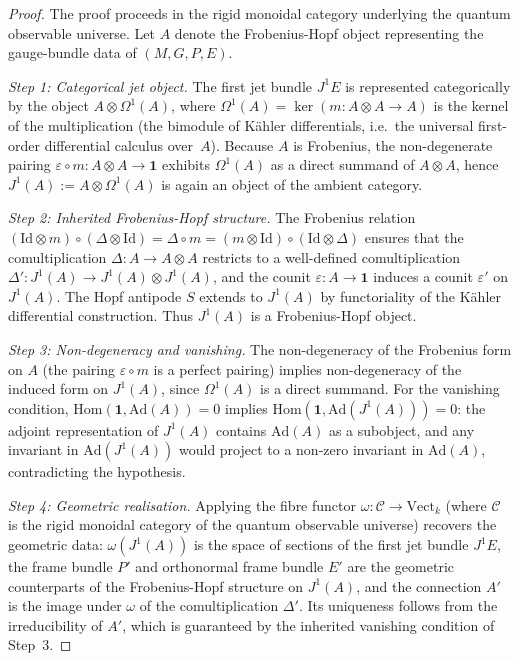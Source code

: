 \documentclass[12pt,a4paper]{report}
\begin{document}
\begin{proof}
The proof proceeds in the rigid monoidal category underlying the quantum
observable universe.  Let $A$ denote the Frobenius-Hopf object
representing the gauge-bundle data of $(M,G,P,E)$.

\emph{Step 1: Categorical jet object.}\;
The first jet bundle $J^1 E$ is represented categorically by the object
$A \otimes \Omega^1(A)$, where
$\Omega^1(A) = \ker(m\colon A\otimes A \to A)$
is the kernel of the multiplication (the bimodule of K\"ahler
differentials, i.e.\ the universal first-order differential calculus
over~$A$).
Because $A$ is Frobenius, the non-degenerate pairing
$\varepsilon \circ m \colon A \otimes A \to \mathbf{1}$ exhibits
$\Omega^1(A)$ as a direct summand of $A \otimes A$, hence
$J^1(A) := A \otimes \Omega^1(A)$ is again an object of the ambient
category.

\emph{Step 2: Inherited Frobenius-Hopf structure.}\;
The Frobenius relation
$(\mathrm{Id} \otimes m) \circ (\Delta \otimes \mathrm{Id})
 = \Delta \circ m
 = (m \otimes \mathrm{Id}) \circ (\mathrm{Id} \otimes \Delta)$
ensures that the comultiplication $\Delta\colon A \to A \otimes A$ restricts
to a well-defined comultiplication
$\Delta'\colon J^1(A) \to J^1(A) \otimes J^1(A)$, and the counit
$\varepsilon\colon A \to \mathbf{1}$ induces a counit $\varepsilon'$ on
$J^1(A)$.  The Hopf antipode $S$ extends to $J^1(A)$ by functoriality of the
K\"ahler differential construction.  Thus $J^1(A)$ is a Frobenius-Hopf object.

\emph{Step 3: Non-degeneracy and vanishing.}\;
The non-degeneracy of the Frobenius form on $A$ (the pairing
$\varepsilon \circ m$ is a perfect pairing) implies non-degeneracy of the
induced form on $J^1(A)$, since $\Omega^1(A)$ is a direct summand.
For the vanishing condition, $\mathrm{Hom}(\mathbf{1}, \mathrm{Ad}(A)) = 0$
implies $\mathrm{Hom}(\mathbf{1}, \mathrm{Ad}(J^1(A))) = 0$: the adjoint
representation of $J^1(A)$ contains $\mathrm{Ad}(A)$ as a subobject, and any
invariant in $\mathrm{Ad}(J^1(A))$ would project to a non-zero invariant in
$\mathrm{Ad}(A)$, contradicting the hypothesis.

\emph{Step 4: Geometric realisation.}\;
Applying the fibre functor $\omega\colon \mathcal{C} \to \mathrm{Vect}_k$
(where $\mathcal{C}$ is the rigid monoidal category of the quantum
observable universe)
recovers the geometric data: $\omega(J^1(A))$ is the space of sections of the
first jet bundle $J^1 E$, the frame bundle $P'$ and orthonormal frame bundle
$E'$ are the geometric counterparts of the Frobenius-Hopf structure on
$J^1(A)$, and the connection $A'$ is the image under $\omega$ of the
comultiplication $\Delta'$.  Its uniqueness follows from the irreducibility
of $A'$, which is guaranteed by the inherited vanishing condition of
Step~3.
\end{proof}
\end{document}
